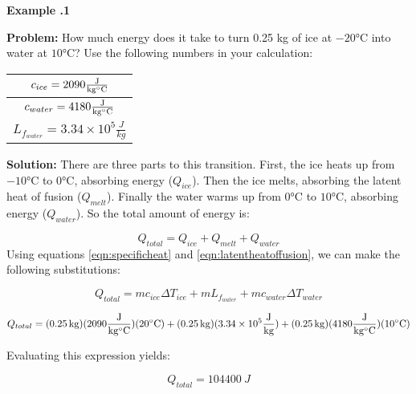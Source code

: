 		
	\begin{mdframed}[backgroundcolor=blue!10!white]
	\begin{center}
		
		
		\textbf{Example \thesection.1}	
	\end{center}
	
	\textbf{Problem: } How much energy does it take to turn 0.25 kg of ice at $-20 \si{\degreeCelsius}$ into water at $10 \si{\degreeCelsius}$?  Use the following numbers in your calculation: 
	\vspace{0.1 in}
	\begin{center}
		

	\begin{tabular}{|c|}
		\hline
			$c_{ice} = 2090 \si{\frac{J}{kg \degreeCelsius}}$ \\
			\hline
			$c_{water} = 4180 \si{\frac{J}{kg \degreeCelsius}}$\\
	\hline
	$L_{f_{water}} = 3.34 \times 10^5 \si{\frac{J}{kg}}$
	\\
	\hline

	\end{tabular}
	\end{center}
	
	\vspace{0.1in}
	
	\textbf{Solution:} There are three parts to this transition.  First, the ice heats up from $-10 \si{\degreeCelsius}$ to $0 \si{\degreeCelsius}$, absorbing energy ($Q_{ice}$).  Then the ice melts, absorbing the latent heat of fusion ($Q_{melt}$).  Finally the water warms up from $0 \si{\degreeCelsius}$ to $10 \si{\degreeCelsius}$, absorbing energy ($Q_{water}$).  So the total amount of energy is:
	
	\begin{equation*}
	Q_{total} = Q_{ice} + Q_{melt} + Q_{water}
	\end{equation*}
	Using equations \ref{eqn:specificheat} and \ref{eqn:latentheatoffusion}, we can make the following substitutions:
	
		\begin{equation*}
		Q_{total} = m c_{ice} \Delta T_{ice} + m L_{f_{water}} + m c_{water} \Delta T_{water} 
	\end{equation*}

	\begin{equation*}
		Q_{total} = (\SI{0.25}{kg})(2090 \si{\frac{J}{kg \degreeCelsius}})(20 \si{\degreeCelsius}) + (\SI{0.25}{kg})(3.34 \times 10^5 \si{\frac{J}{kg}}) + (\SI{0.25}{kg})(4180 \si{\frac{J}{kg \degreeCelsius}})(10 \si{\degreeCelsius}) 
	\end{equation*}

Evaluating this expression yields:

\begin{equation*}
	Q_{total} = \SI{104400}{J}
\end{equation*}
\end{mdframed}

